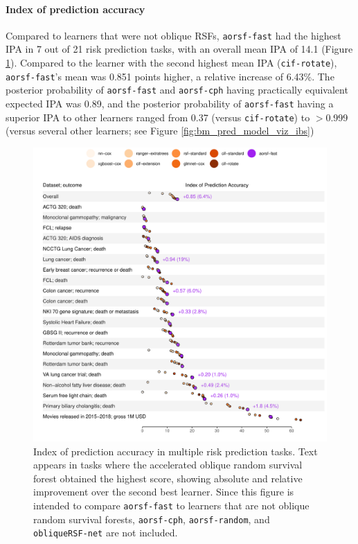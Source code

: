\documentclass[12pt]{article}\usepackage[]{graphicx}\usepackage[]{xcolor}
\makeatletter
\def\maxwidth{ %
  \ifdim\Gin@nat@width>\linewidth
    \linewidth
  \else
    \Gin@nat@width
  \fi
}
\newenvironment{knitrout}{}{} %
\makeatother
\begin{document}
\paragraph{Index of prediction accuracy}

Compared to learners that were not oblique RSFs, \texttt{aorsf-fast} had the highest IPA in 7 out of 21 risk prediction tasks, with an overall mean IPA of 14.1 (Figure \ref{fig:bm_pred_viz_ibs}). Compared to the learner with the second highest mean IPA (\texttt{cif-rotate}), \texttt{aorsf-fast}'s mean was 0.851 points higher, a relative increase of 6.43\%. The posterior probability of \texttt{aorsf-fast} and \texttt{aorsf-cph} having practically equivalent expected IPA was 0.89, and the posterior probability of \texttt{aorsf-fast} having a superior IPA to other learners ranged from 0.37 (versus \texttt{cif-rotate}) to $>$0.999 (versus several other learners; see Figure \ref{fig:bm_pred_model_viz_ibs})

\begin{knitrout}
\color{fgcolor}\begin{figure}
\includegraphics[width=\maxwidth]{figure/bm_pred_viz_ibs-1} \caption[Index of prediction accuracy in multiple risk prediction tasks]{Index of prediction accuracy in multiple risk prediction tasks. Text appears in tasks where the accelerated oblique random survival forest obtained the highest score, showing absolute and relative improvement over the second best learner. Since this figure is intended to compare \texttt{aorsf-fast} to learners that are not oblique random survival forests, \texttt{aorsf-cph}, \texttt{aorsf-random}, and \texttt{obliqueRSF-net} are not included.}\label{fig:bm_pred_viz_ibs}
\end{figure}

\end{knitrout}
\end{document}
